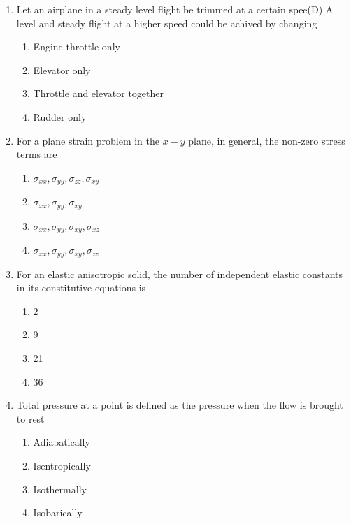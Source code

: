 \documentclass{article}
\begin{document}
\begin{enumerate}
    \item Let an airplane in a steady level flight be trimmed at a certain spee(D) A level and steady flight at a higher speed could be achived by changing 
    \begin{enumerate}
        \item Engine throttle only
        \item Elevator only
        \item Throttle and elevator together
        \item Rudder only
    \end{enumerate}
        

    \item For a plane strain problem in the $x-y$ plane, in general, the non-zero stress terms are 
    \begin{multicols}{2}
    \begin{enumerate}
        \item $\sigma_{xx}, \sigma_{yy}, \sigma_{zz}, \sigma_{xy}$ 
        \item $\sigma_{xx}, \sigma_{yy}, \sigma_{xy}$ 
        \item $\sigma_{xx}, \sigma_{yy}, \sigma_{xy}, \sigma_{xz}$ 
        \item $\sigma_{xx}, \sigma_{yy}, \sigma_{xy}, \sigma_{zz}$
    \end{enumerate}
    \end{multicols}
        

    \item For an elastic anisotropic solid, the number of independent elastic constants in its constitutive equations is
    \begin{multicols}{4}
    \begin{enumerate}
        \item 2 
        \item 9 
        \item 21 
        \item 36
    \end{enumerate}
    \end{multicols}
        

    \item Total pressure at a point is defined as the pressure when the flow is brought to rest 
    \begin{enumerate}
        \item Adiabatically
        \item Isentropically
        \item Isothermally
        \item Isobarically
    \end{enumerate}
        


\end{enumerate}
\end{document}
